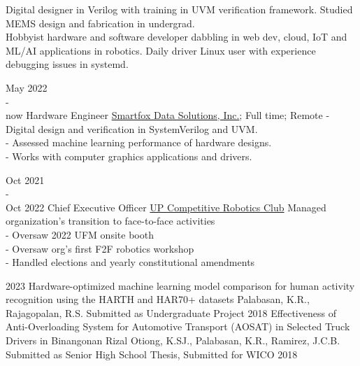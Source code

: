 \documentclass[9pt]{developercv}
\begin{document}
\begin{minipage}[t]{0.475\textwidth} 
	\vspace{-\baselineskip}

	Digital designer in Verilog with training in UVM verification framework. Studied MEMS design and fabrication in undergrad. \\

	Hobbyist hardware and software developer dabbling in web dev, cloud, IoT and ML/AI applications in robotics. Daily driver Linux user with experience debugging issues in systemd.


	\begin{entrylist}
		\entry
			{May 2022 \\ - \\ now}
			{Hardware Engineer}
			{\href{https://smartfoxdata.com}{Smartfox Data Solutions, Inc.}; Full time; Remote}
			{
				- Digital design and verification in SystemVerilog and UVM. \\
				- Assessed machine learning performance of hardware designs. \\
				- Works with computer graphics applications and drivers.
			}	
	\end{entrylist}
	\cvsect{Organizations}
	\begin{entrylist}
		\entry
			{Oct 2021 \\ - \\ Oct 2022}
			{Chief Executive Officer}
			{\href{https://upcrc.org}{UP Competitive Robotics Club}}
			{Managed organization's transition to face-to-face activities\\
			- Oversaw 2022 UFM onsite booth\\
			- Oversaw org's first F2F robotics workshop\\
			- Handled elections and yearly constitutional amendments}
	\end{entrylist}
	\cvsect{Publications}
	\begin{entrylist}
		\entry
			{2023}
			{Hardware-optimized machine learning model comparison for human activity recognition using the HARTH and HAR70+ datasets}
			{Palabasan, K.R., Rajagopalan, R.S.}
			{Submitted as Undergraduate Project}
		\entry
			{2018}
			{Effectiveness of Anti-Overloading System for Automotive Transport (AOSAT) in Selected Truck Drivers in Binangonan Rizal}
			{Otiong, K.SJ., Palabasan, K.R., Ramirez, J.C.B.}
			{Submitted as Senior High School Thesis, Submitted for WICO 2018}
	\end{entrylist}

\end{minipage}
\end{document}
